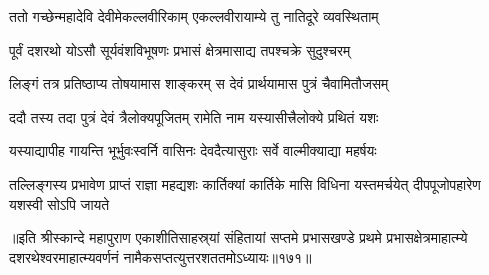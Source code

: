 
\vakta{}
\shrota{}
\tags{}
\notes{}

\storymeta





\twolineshloka
{ततो गच्छेन्महादेवि देवीमेकल्लवीरिकाम्}
{एकल्लवीरायाम्ये तु नातिदूरे व्यवस्थिताम्}%

\twolineshloka
{पूर्वं दशरथो योऽसौ सूर्यवंशविभूषणः}
{प्रभासं क्षेत्रमासाद्य तपश्चक्रे सुदुश्चरम्}%

\twolineshloka
{लिङ्गं तत्र प्रतिष्ठाप्य तोषयामास शाङ्करम्}
{स देवं प्रार्थयामास पुत्रं चैवामितौजसम्}%

\twolineshloka
{ददौ तस्य तदा पुत्रं देवं त्रैलोक्यपूजितम्}
{रामेति नाम यस्यासीत्त्रैलोक्ये प्रथितं यशः}%

\twolineshloka
{यस्याद्यापीह गायन्ति भूर्भुवःस्वर्नि वासिनः}
{देवदैत्यासुराः सर्वे वाल्मीक्याद्या महर्षयः}%

\threelineshloka
{तल्लिङ्गस्य प्रभावेण प्राप्तं राज्ञा महद्यशः}
{कार्तिक्यां कार्तिके मासि विधिना यस्तमर्चयेत्}
{दीपपूजोपहारेण यशस्वी सोऽपि जायते}%

॥इति श्रीस्कान्दे महापुराण एकाशीतिसाहस्र्यां संहितायां सप्तमे प्रभासखण्डे प्रथमे प्रभासक्षेत्रमाहात्म्ये दशरथेश्वरमाहात्म्यवर्णनं नामैकसप्तत्युत्तरशततमोऽध्यायः॥१७१॥